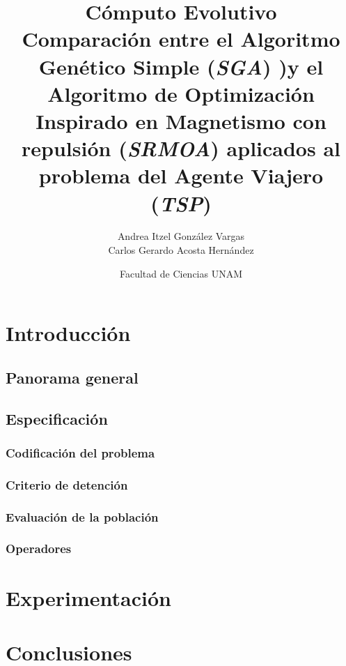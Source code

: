 \documentclass[12pt]{article}
\title{Cómputo Evolutivo \\ Comparación entre el Algoritmo Genético Simple (\textit{SGA}) )y el Algoritmo de Optimización Inspirado en Magnetismo con repulsión (\textit{SRMOA}) aplicados al problema del Agente Viajero (\textit{TSP})}
\author{Andrea Itzel González Vargas \\
  Carlos Gerardo Acosta Hernández}
\date{Facultad de Ciencias UNAM \\ }
\begin{document}
\maketitle
\section*{Introducción}
\subsection*{Panorama general}

\newpage
\subsection*{Especificación}

\subsubsection*{Codificación del problema}

\subsubsection*{Criterio de detención}

\subsubsection*{Evaluación de la población}

\subsubsection*{Operadores}

\section*{Experimentación}

\section*{Conclusiones}
\end{document}
